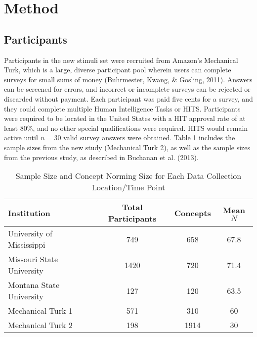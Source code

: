 \documentclass[english,,man]{apa6}
\theoremstyle{definition}
\theoremstyle{definition}
\theoremstyle{definition}
\theoremstyle{remark}
\begin{document}
\hypertarget{method}{%
\section{Method}\label{method}}

\hypertarget{participants}{%
\subsection{Participants}\label{participants}}

Participants in the new stimuli set were recruited from Amazon's
Mechanical Turk, which is a large, diverse participant pool wherein
users can complete surveys for small sums of money (Buhrmester, Kwang,
\& Gosling, 2011). Answers can be screened for errors, and incorrect or
incomplete surveys can be rejected or discarded without payment. Each
participant was paid five cents for a survey, and they could complete
multiple Human Intelligence Tasks or HITS. Participants were required to
be located in the United States with a HIT approval rate of at least
80\%, and no other special qualifications were required. HITS would
remain active until \emph{n} = 30 valid survey answers were obtained.
Table \ref{tab:part-table} includes the sample sizes from the new study
(Mechanical Turk 2), as well as the sample sizes from the previous
study, as described in Buchanan et al. (2013).

\begin{table}[tbp]
\begin{center}
\begin{threeparttable}
\caption{\label{tab:part-table}Sample Size and Concept Norming Size for Each Data Collection Location/Time Point}
\begin{tabular}{lccc}
\toprule
Institution & Total Participants & Concepts & Mean $N$\\
\midrule
University of Mississippi & 749 & 658 & 67.8\\
Missouri State University & 1420 & 720 & 71.4\\
Montana State University & 127 & 120 & 63.5\\
Mechanical Turk 1 & 571 & 310 & 60\\
Mechanical Turk 2 & 198 & 1914 & 30\\
\bottomrule
\end{tabular}
\end{threeparttable}
\end{center}
\end{table}
\end{document}
